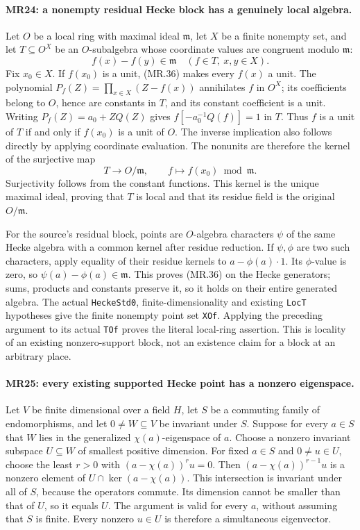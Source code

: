 \paragraph{MR24: a nonempty residual Hecke block has a genuinely local algebra.}
Let $O$ be a local ring with maximal ideal $\mathfrak m$, let
$X$ be a finite nonempty set, and let
$T\subseteq O^X$ be an $O$-subalgebra whose coordinate values
are congruent modulo $\mathfrak m$:
\[
             f(x)-f(y)\in\mathfrak m
       \quad(f\in T,\ x,y\in X).                       \tag{MR.36}
\]
Fix $x_0\in X$. If $f(x_0)$ is a unit, (MR.36) makes every
$f(x)$ a unit. The polynomial
$P_f(Z)=\prod_{x\in X}(Z-f(x))$ annihilates $f$ in $O^X$;
its coefficients belong to $O$, hence are constants in $T$,
and its constant coefficient is a unit. Writing
$P_f(Z)=a_0+ZQ(Z)$ gives
$f[-a_0^{-1}Q(f)]=1$ in $T$. Thus $f$ is a unit of $T$
if and only if $f(x_0)$ is a unit of $O$. The inverse implication
also follows directly by applying coordinate evaluation.
The nonunits are therefore the kernel of the surjective map
\[
               T\longrightarrow O/\mathfrak m,
                   \qquad f\longmapsto f(x_0)\bmod\mathfrak m.
                                                               \tag{MR.37}
\]
Surjectivity follows from the constant functions. This kernel
is the unique maximal ideal, proving that $T$ is local and that
its residue field is the original $O/\mathfrak m$.

For the source's residual block, points are $O$-algebra
characters $\psi$ of the same Hecke algebra with a common
kernel after residue reduction. If $\psi,\phi$ are two such
characters, apply equality of their residue kernels to
$a-\phi(a)\cdot1$. Its $\phi$-value is zero, so
$\psi(a)-\phi(a)\in\mathfrak m$. This proves (MR.36) on the
Hecke generators; sums, products and constants preserve it,
so it holds on their entire generated algebra. The actual
\texttt{HeckeStd0}, finite-dimensionality and existing
\texttt{LocT} hypotheses give the finite nonempty point set
\texttt{XOf}. Applying the preceding argument to its actual
\texttt{TOf} proves the literal local-ring assertion. This is
locality of an existing nonzero-support block, not an existence
claim for a block at an arbitrary place.

\paragraph{MR25: every existing supported Hecke point has a nonzero eigenspace.}
Let $V$ be finite dimensional over a field $H$, let $S$ be a
commuting family of endomorphisms, and let $0\ne W\subseteq V$
be invariant under $S$. Suppose for every $a\in S$ that
$W$ lies in the generalized $\chi(a)$-eigenspace of $a$.
Choose a nonzero invariant subspace $U\subseteq W$ of smallest
positive dimension. For fixed $a\in S$ and $0\ne u\in U$,
choose the least $r>0$ with $(a-\chi(a))^ru=0$.
Then $(a-\chi(a))^{r-1}u$ is a nonzero element of
$U\cap\ker(a-\chi(a))$. This intersection is invariant under
all of $S$, because the operators commute. Its dimension cannot
be smaller than that of $U$, so it equals $U$. The argument is
valid for every $a$, without assuming that $S$ is finite.
Every nonzero $u\in U$ is therefore a simultaneous eigenvector.

